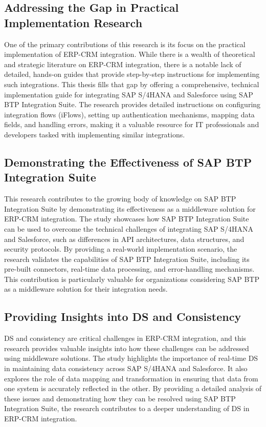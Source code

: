 \subsection{Addressing the Gap in Practical Implementation Research}
One of the primary contributions of this research is its focus on the practical implementation of ERP-CRM integration. While there is a wealth of theoretical and strategic literature on ERP-CRM integration, there is a notable lack of detailed, hands-on guides that provide step-by-step instructions for implementing such integrations. This thesis fills that gap by offering a comprehensive, technical implementation guide for integrating SAP S/4HANA and Salesforce using SAP BTP Integration Suite. The research provides detailed instructions on configuring integration flows (iFlows), setting up authentication mechanisms, mapping data fields, and handling errors, making it a valuable resource for IT professionals and developers tasked with implementing similar integrations.

\subsection{Demonstrating the Effectiveness of SAP BTP Integration Suite}
This research contributes to the growing body of knowledge on SAP BTP Integration Suite by demonstrating its effectiveness as a middleware solution for ERP-CRM integration. The study showcases how SAP BTP Integration Suite can be used to overcome the technical challenges of integrating SAP S/4HANA and Salesforce, such as differences in API architectures, data structures, and security protocols. By providing a real-world implementation scenario, the research validates the capabilities of SAP BTP Integration Suite, including its pre-built connectors, real-time data processing, and error-handling mechanisms. This contribution is particularly valuable for organizations considering SAP BTP as a middleware solution for their integration needs.

\subsection{Providing Insights into DS and Consistency}
DS and consistency are critical challenges in ERP-CRM integration, and this research provides valuable insights into how these challenges can be addressed using middleware solutions. The study highlights the importance of real-time DS in maintaining data consistency across SAP S/4HANA and Salesforce. It also explores the role of data mapping and transformation in ensuring that data from one system is accurately reflected in the other. By providing a detailed analysis of these issues and demonstrating how they can be resolved using SAP BTP Integration Suite, the research contributes to a deeper understanding of DS in ERP-CRM integration.

